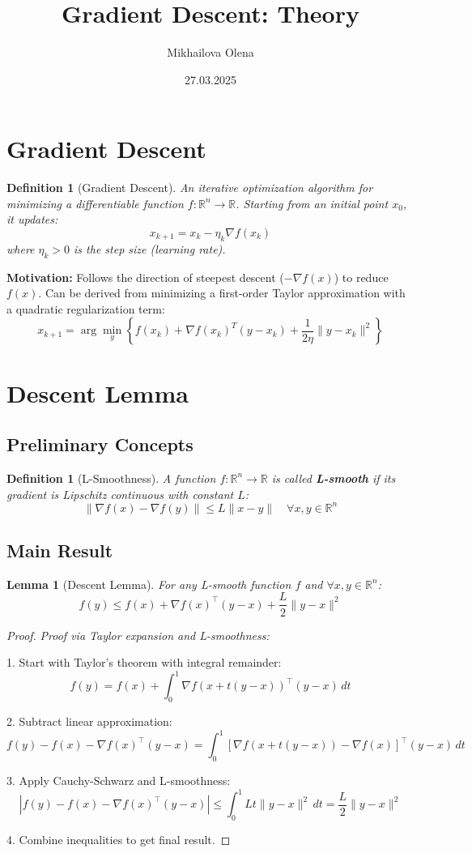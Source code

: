 \documentclass{article}
\title{Gradient Descent: Theory}
\author{Mikhailova Olena}
\date{27.03.2025}
\newtheorem{lemma}[theorem]{Lemma}
\newtheorem{definition}[theorem]{Definition}
\begin{document}
\maketitle

\section{Gradient Descent}
\begin{definition}[Gradient Descent]
An iterative optimization algorithm for minimizing a differentiable function \( f: \mathbb{R}^n \to \mathbb{R} \). Starting from an initial point \( x_0 \), it updates:
\[
x_{k+1} = x_k - \eta_k \nabla f(x_k)
\]
where \( \eta_k > 0 \) is the step size (learning rate).
\end{definition}

\textbf{Motivation:} Follows the direction of steepest descent (\(-\nabla f(x)\)) to reduce \( f(x) \). Can be derived from minimizing a first-order Taylor approximation with a quadratic regularization term:
\[
x_{k+1} = \arg\min_y \left\{ f(x_k) + \nabla f(x_k)^T (y - x_k) + \frac{1}{2\eta} \|y - x_k\|^2 \right\}
\]

\section{Descent Lemma}

\subsection{Preliminary Concepts}
\begin{definition}[L-Smoothness]
A function \( f: \mathbb{R}^n \to \mathbb{R} \) is called \textbf{L-smooth} if its gradient is Lipschitz continuous with constant \( L \):
\[
\|\nabla f(x) - \nabla f(y)\| \leq L \|x - y\| \quad \forall x, y \in \mathbb{R}^n
\]
\end{definition}

\subsection{Main Result}
\begin{lemma}[Descent Lemma]
For any L-smooth function \( f \) and \( \forall x, y \in \mathbb{R}^n \):
\[
f(y) \leq f(x) + \nabla f(x)^\top (y - x) + \frac{L}{2} \|y - x\|^2
\]
\end{lemma}

\begin{proof}
\textit{Proof via Taylor expansion and L-smoothness:}

1. Start with Taylor's theorem with integral remainder:
\[
f(y) = f(x) + \int_0^1 \nabla f(x + t(y - x))^\top (y - x) \, dt
\]

2. Subtract linear approximation:
\[
f(y) - f(x) - \nabla f(x)^\top (y - x) = \int_0^1 [\nabla f(x + t(y - x)) - \nabla f(x)]^\top (y - x) \, dt
\]

3. Apply Cauchy-Schwarz and L-smoothness:
\[
\left| f(y) - f(x) - \nabla f(x)^\top (y - x) \right| \leq \int_0^1 L t \|y - x\|^2 \, dt = \frac{L}{2} \|y - x\|^2
\]

4. Combine inequalities to get final result.
\end{proof}
\end{document}

